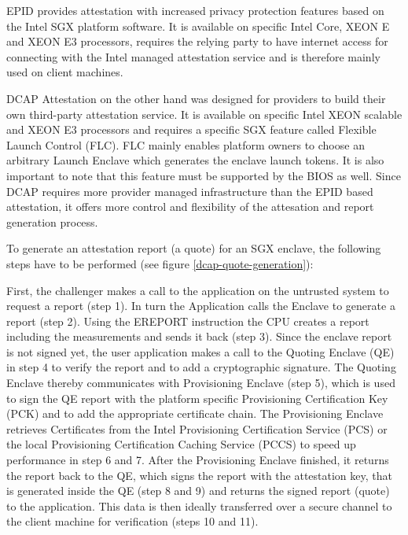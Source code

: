 EPID provides attestation with increased privacy protection features based on the Intel SGX platform software. It is available on specific Intel Core, XEON E and XEON E3 processors, requires the relying party to have internet access for connecting with the Intel managed attestation service and is therefore mainly used on client machines. \cite{sgx_website}

DCAP Attestation on the other hand was designed for providers to build their own third-party attestation service. It is available on specific Intel XEON scalable and XEON E3 processors and requires a specific SGX feature called Flexible Launch Control (FLC). FLC mainly enables platform owners to choose an arbitrary Launch Enclave which generates the enclave launch tokens. It is also important to note that this feature must be supported by the BIOS as well. \cite{sgx_website}
Since DCAP requires more provider managed infrastructure than the EPID based attestation, it offers more control and flexibility of the attesation and report generation process. 

To generate an attestation report (a quote) for an SGX enclave, the following steps have to be performed (see figure \ref{dcap-quote-generation}): 

First, the challenger makes a call to the application on the untrusted system to request a report (step 1).
In turn the Application calls the Enclave to generate a report (step 2).
Using the EREPORT instruction the CPU creates a report including the measurements and sends it back (step 3). Since the enclave report is not signed yet, the user application makes a call to the Quoting Enclave (QE) in step 4 to verify the report and to add a cryptographic signature. The Quoting Enclave thereby communicates with Provisioning Enclave (step 5), which is used to sign the QE report with the platform specific Provisioning Certification Key (PCK) and to add the appropriate certificate chain. The Provisioning Enclave retrieves Certificates from the Intel Provisioning Certification Service (PCS) or the local Provisioning Certification Caching Service (PCCS) to speed up performance in step 6 and 7. After the Provisioning Enclave finished, it returns the report back to the QE, which signs the report with the attestation key, that is generated inside the QE (step 8 and 9) and returns the signed report (quote) to the application. This data is then ideally transferred over a secure channel to the client machine for verification (steps 10 and 11).  \cite{gramine_dcap_attesation}


